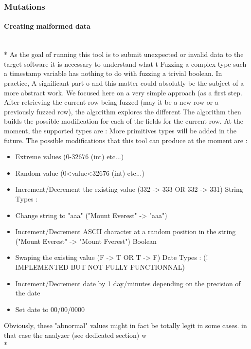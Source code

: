 \documentclass{article}
\begin{document}
  				
			\subsubsection{Mutations}
				\paragraph{Creating malformed data}
\\*
As the goal of running this tool is to submit unexpected or invalid data to the target software it is necessary to understand what t
Fuzzing a complex type such a timestamp variable has nothing to do with fuzzing a trivial boolean. In practice, A significant part o
and this matter could absolutly be the subject of a more abstract work. We focused here on a very simple approach (as a first step.
After retrieving the current row being fuzzed (may it be a new row or a previously fuzzed row), the algorithm explores the different
The algorithm then builds the possible modification for each of the fields for the current row.
At the moment, the supported types are : %
More primitives types will be added in the future.
The possible modifications that this tool can produce at the moment are : %
				\begin{itemize}
					Number Types :
					\item Extreme values (0-32676 (int) etc...)
					\item Random value (0<value<32676 (int) etc...)
					\item Increment/Decrement the existing value (332 -> 333 OR 332 -> 331)
					String Types :
					\item Change string to "aaa" ("Mount Everest" -> "aaa")
					\item Increment/Decrement ASCII character at a random position in the string ("Mount Everest" -> "Mount Fverest")
					Boolean
					\item Swaping the existing value (F -> T OR T -> F)
					Date Types : (! IMPLEMENTED BUT NOT FULLY FUNCTIONNAL)
					\item Increment/Decrement date by 1 day/minutes depending on the precision of the date
					\item Set date to 00/00/0000
				\end{itemize}
Obviously, these "abnormal" values might in fact be totally legit in some cases. in that case the analyzer (see dedicated section) w
				\\*
\end{document}
